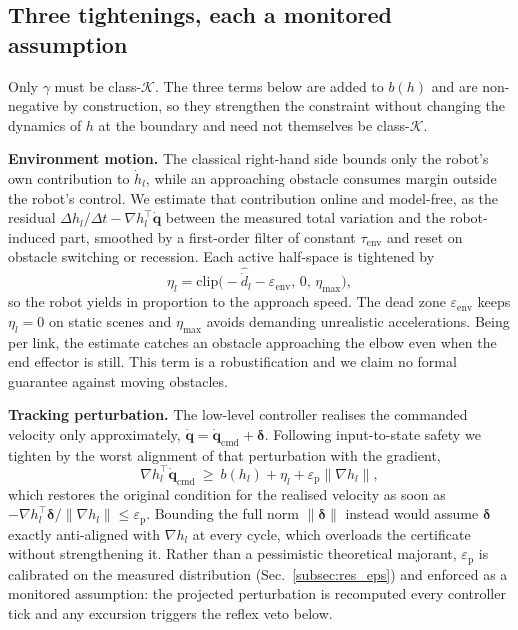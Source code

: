\documentclass[journal]{IEEEtran}
\newcommand{\qdot}{\dot{\mathbf{q}}}
\begin{document}
\subsection{Three tightenings, each a monitored assumption}\label{subsec:tightening}
Only $\gamma$ must be class-$\mathcal{K}$. The three terms below are added to $b(h)$ and are non-negative by construction, so they strengthen the constraint without changing the dynamics of $h$ at the boundary and need not themselves be class-$\mathcal{K}$.

\textbf{Environment motion.} The classical right-hand side bounds only the robot's own contribution to $\dot h_l$, while an approaching obstacle consumes margin outside the robot's control. We estimate that contribution online and model-free, as the residual $\Delta h_l/\Delta t-\nabla h_l^{\top}\qdot$ between the measured total variation and the robot-induced part, smoothed by a first-order filter of constant $\tau_{\mathrm{env}}$ and reset on obstacle switching or recession. Each active half-space is tightened by
\begin{equation}
\eta_l=\mathrm{clip}\big(-\hat{\dot d}_l-\varepsilon_{\mathrm{env}},\,0,\,\eta_{\max}\big),
\end{equation}
so the robot yields in proportion to the approach speed. The dead zone $\varepsilon_{\mathrm{env}}$ keeps $\eta_l=0$ on static scenes and $\eta_{\max}$ avoids demanding unrealistic accelerations. Being per link, the estimate catches an obstacle approaching the elbow even when the end effector is still. This term is a robustification and we claim no formal guarantee against moving obstacles.

\textbf{Tracking perturbation.} The low-level controller realises the commanded velocity only approximately, $\qdot=\qdot_{\mathrm{cmd}}+\bm{\delta}$. Following input-to-state safety \cite{Kolathaya2019Input} we tighten by the worst alignment of that perturbation with the gradient,
\begin{equation}\label{eq:issf}
\nabla h_l^{\top}\qdot_{\mathrm{cmd}}\ \ge\ b(h_l)+\eta_l+\varepsilon_{\mathrm{p}}\|\nabla h_l\|,
\end{equation}
which restores the original condition for the realised velocity as soon as $-\nabla h_l^{\top}\bm{\delta}/\|\nabla h_l\|\le\varepsilon_{\mathrm{p}}$. Bounding the full norm $\|\bm{\delta}\|$ instead would assume $\bm{\delta}$ exactly anti-aligned with $\nabla h_l$ at every cycle, which overloads the certificate without strengthening it. Rather than a pessimistic theoretical majorant, $\varepsilon_{\mathrm{p}}$ is calibrated on the measured distribution (Sec.~\ref{subsec:res_eps}) and enforced as a monitored assumption: the projected perturbation is recomputed every controller tick and any excursion triggers the reflex veto below.
\end{document}

